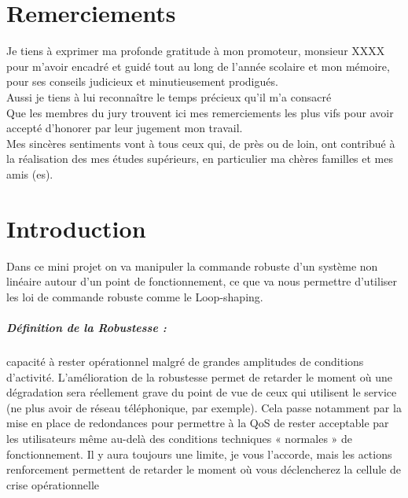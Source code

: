 \documentclass[12pt, a4paper, openany]{report}
\begin{document}
\makeatother



\chapter*{Remerciements}

  Je tiens à exprimer ma profonde gratitude à mon promoteur, monsieur XXXX pour m'avoir encadré et guidé tout au long de l'année scolaire et mon mémoire, pour ses conseils judicieux et minutieusement prodigués.\\
  
  Aussi je tiens à lui reconnaître le temps précieux qu’il m'a consacré \\
  
   Que les membres du jury trouvent ici mes remerciements les plus vifs pour avoir accepté d’honorer par leur jugement mon travail.\\
   
   Mes sincères sentiments vont à tous ceux qui, de près ou de loin, ont contribué à la réalisation des mes études supérieurs, en particulier ma chères familles et mes amis (es).\\
   
   
\renewcommand{\contentsname}{Sommaire}
\tableofcontents



\chapter*{Introduction}

Dans ce mini projet on va manipuler la commande robuste d’un système non linéaire autour d’un point de fonctionnement, ce que va nous permettre d’utiliser les loi de commande robuste comme le Loop-shaping.\\

 
 \paragraph{Définition de la Robustesse :}  capacité à rester opérationnel malgré de grandes amplitudes de conditions d’activité.
L’amélioration de la robustesse permet de retarder le moment où une dégradation sera réellement grave du point de vue de ceux qui utilisent le service (ne plus avoir de réseau téléphonique, par exemple).
Cela passe notamment par la mise en place de redondances pour permettre à la QoS de rester acceptable par les utilisateurs même au-delà des conditions techniques « normales » de fonctionnement. Il y aura toujours une limite, je vous l’accorde, mais les actions renforcement permettent de retarder le moment où vous déclencherez la cellule de crise opérationnelle \cite{ref1}
    
\end{document}
